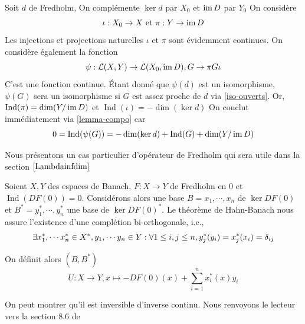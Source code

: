 \documentclass[memoire.tex]{subfiles}
\begin{document}
\begin{preuve}
    Soit $d$ de Fredholm,
    On complémente $\ker d$ par $X_0$ et $\operatorname{im} D$ par $Y_0$
    On considère
    \begin{equation*}
        \iota: X_0\rightarrow X\text{ et }\pi: Y\rightarrow \operatorname{im} D
    \end{equation*}
    Les injections et projections naturelles $\iota$ et $\pi$ sont évidemment continues. On considère également la fonction
    \begin{equation*}
        \psi : \mathcal{L}(X,Y)\rightarrow \mathcal{L}(X_0,\operatorname{im} D), G\rightarrow \pi G\iota 
    \end{equation*}
    C'est une fonction continue. Étant donné que $\psi(d)$ est un isomorphisme, $\psi(G)$ sera un isomorphisme si $G$ est assez proche de $d$ via \ref{iso-ouverts}. Or, $\operatorname{Ind}(\pi)=\dim (Y/\operatorname{im} D)$ et $\operatorname{Ind}(\iota)=-\dim (\ker d)$
    On conclut immédiatement via \ref{lemma-compo} car 
    \begin{equation*}
        0=\operatorname{Ind}(\psi(G))= -\dim(\ker d)+\operatorname{Ind}(G)+\dim(Y/\operatorname{im} D)
    \end{equation*} 
\end{preuve}

Nous présentons un cas particulier d’opérateur de Fredholm qui sera utile dans la section $\ref{Lambdainfdim}$
\begin{definition}
    Soient $X,Y$ des espaces de Banach, $F:X\rightarrow Y$ de Fredholm en $0$ et $\operatorname*{Ind}(DF(0))=0$. Considérons alors une base $B=x_1,\cdots,x_n$ de $\ker DF(0)$ et  $B^{*}=y^{*}_1,\cdots,y^{*}_n$ une base de $\ker{ DF(0)}^{*}$. Le théorème de Hahn-Banach nous assure l’existence d'une complétion bi-orthogonale, i.e., 
    \begin{equation*}
        \exists x^{*}_1,\cdots x^{*}_n\in X^{*}, y_1,\cdots y_n\in Y:\forall 1\leq i,j\leq n,\space  y^{*}_j(y_i)= x^{*}_j(x_i)=\delta_{ij}
    \end{equation*}
\end{definition}

On définit alors   $(B,B^{*})$
\begin{equation}\label{OpSCHimdt}
    U : X\rightarrow Y, x\mapsto -DF(0)(x)+\sum_{i=1}^n x_i^{*}(x)y_i
\end{equation}

On peut montrer qu'il est inversible d'inverse continu. Nous renvoyons le lecteur vers la section 8.6 de \cite{zeidler1986nonlinear}
\end{document}
